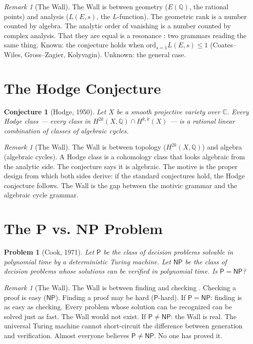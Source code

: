 \documentclass[12pt]{article}
\newtheorem{conjecture}[theorem]{Conjecture}
\newtheorem{problem}[theorem]{Problem}
\theoremstyle{definition}
\theoremstyle{remark}
\newtheorem{remark}[theorem]{Remark}
\begin{document}
\begin{remark}[The Wall]
The Wall is between geometry ($E(\mathbb{Q})$, the rational points)
and analysis ($L(E,s)$, the $L$-function).
The geometric rank is a number counted by algebra.
The analytic order of vanishing is a number counted by complex analysis.
That they are equal is a resonance \cite{resonance}:
two grammars reading the same thing.
Known: the conjecture holds when
$\mathrm{ord}_{s=1} L(E,s) \leq 1$ (Coates--Wiles, Gross--Zagier, Kolyvagin).
Unknown: the general case.
\end{remark}

\section{The Hodge Conjecture}

\begin{conjecture}[Hodge, 1950]
Let $X$ be a smooth projective variety over $\mathbb{C}$.
Every Hodge class --- every class in
$H^{2k}(X,\mathbb{Q}) \cap H^{k,k}(X)$ ---
is a rational linear combination of classes of algebraic cycles.
\end{conjecture}

\begin{remark}[The Wall]
The Wall is between topology ($H^{2k}(X,\mathbb{Q})$)
and algebra (algebraic cycles).
A Hodge class is a cohomology class
that looks algebraic from the analytic side.
The conjecture says it is algebraic.
The motive \cite{motives} is the proper design \cite{design}
from which both sides derive:
if the standard conjectures hold, the Hodge conjecture follows.
The Wall is the gap between the motivic grammar
and the algebraic cycle grammar.
\end{remark}

\section{The P vs. NP Problem}

\begin{problem}[Cook, 1971]
Let $\mathsf{P}$ be the class of decision problems
solvable in polynomial time by a deterministic Turing machine.
Let $\mathsf{NP}$ be the class of decision problems
whose solutions can be verified in polynomial time.
Is $\mathsf{P} = \mathsf{NP}$?
\end{problem}

\begin{remark}[The Wall]
The Wall is between finding and checking \cite{turing}.
Checking a proof is easy ($\mathsf{NP}$).
Finding a proof may be hard ($\mathsf{P}$-hard).
If $\mathsf{P} = \mathsf{NP}$: finding is as easy as checking.
Every problem whose solution can be recognized
can be solved just as fast.
The Wall would not exist.
If $\mathsf{P} \neq \mathsf{NP}$: the Wall is real.
The universal Turing machine cannot short-circuit
the difference between generation and verification.
Almost everyone believes $\mathsf{P} \neq \mathsf{NP}$.
No one has proved it.
\end{remark}
\end{document}
